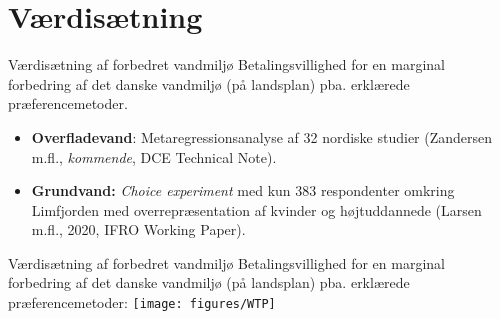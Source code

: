 \section{Værdisætning}

\begin{frame}{Værdisætning af forbedret vandmiljø}
    Betalingsvillighed for en marginal forbedring af det danske vandmiljø (på landsplan) pba. erklærede præferencemetoder.
    \begin{itemize}
      \item \textbf{Overfladevand}:  Metaregressionsanalyse af 32 nordiske studier (Zandersen m.fl., \textit{kommende}, DCE Technical Note).
      \item \textbf{Grundvand:} \textit{Choice experiment} med kun 383 respondenter omkring Limfjorden med overrepræsentation af kvinder og højtuddannede (Larsen m.fl., 2020, IFRO Working Paper).
    \end{itemize}
    \vfill
\end{frame}
\begin{frame}{Værdisætning af forbedret vandmiljø}
  Betalingsvillighed for en marginal forbedring af det danske vandmiljø (på landsplan) pba. erklærede præferencemetoder:
  \texttt{[image: figures/WTP]}
\end{frame}
